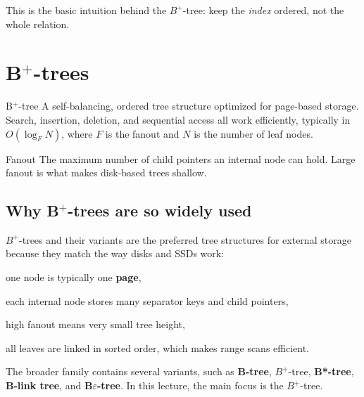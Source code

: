 \documentclass[../../dis.tex]{subfiles}
\begin{document}
This is the basic intuition behind the \mbox{$B^+$-tree}: keep the \emph{index} ordered, not the whole relation.

\section{B\texorpdfstring{$^+$}{+}-trees}
\begin{concept}{B\texorpdfstring{$^+$}{+}-tree}
A self-balancing, ordered tree structure optimized for page-based storage. Search, insertion, deletion, and sequential access all work efficiently, typically in \(O(\log_F N)\), where \(F\) is the fanout and \(N\) is the number of leaf nodes.
\end{concept}

\begin{concept}{Fanout}
The maximum number of child pointers an internal node can hold. Large fanout is what makes disk-based trees shallow.
\end{concept}

\subsection{Why B\texorpdfstring{$^+$}{+}-trees are so widely used}
\mbox{$B^+$-trees} and their variants are the preferred tree structures for external storage because they match the way disks and SSDs work:
\begin{dashlist}
    \item one node is typically one \textbf{page},
    \item each internal node stores many separator keys and child pointers,
    \item high fanout means very small tree height,
    \item all leaves are linked in sorted order, which makes range scans efficient.
\end{dashlist}

The broader family contains several variants, such as \textbf{B-tree}, \mbox{$B^+$-tree}, \textbf{B*-tree}, \textbf{B-link tree}, and \textbf{B\(\varepsilon\)-tree}. In this lecture, the main focus is the \mbox{$B^+$-tree}.
\end{document}
